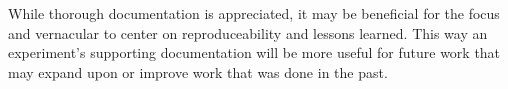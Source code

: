 \documentclass[conference]{IEEEtran} %
\begin{document}
While thorough documentation is appreciated, it may be beneficial for the focus and vernacular to center on reproduceability and lessons learned.
This way an experiment's supporting documentation will be more useful for future work that may expand upon or improve work that was done in the past.

%
\end{document}
